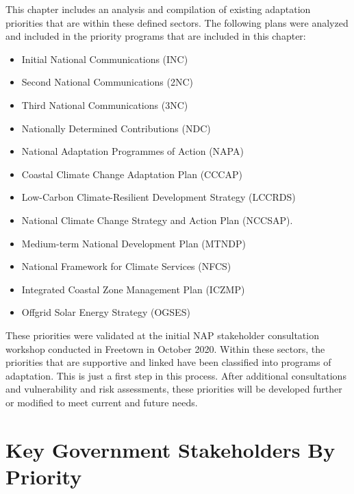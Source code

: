 \documentclass[
]{book}
\providecommand{\tightlist}{%
  \setlength{\itemsep}{0pt}\setlength{\parskip}{0pt}}
\begin{document}
This chapter includes an analysis and compilation of existing adaptation priorities that are within these defined sectors. The following plans were analyzed and included in the priority programs that are included in this chapter:

\begin{itemize}
\tightlist
\item
  Initial National Communications (INC)
\item
  Second National Communications (2NC)
\item
  Third National Communications (3NC)
\item
  Nationally Determined Contributions (NDC)
\item
  National Adaptation Programmes of Action (NAPA)
\item
  Coastal Climate Change Adaptation Plan (CCCAP)
\item
  Low-Carbon Climate-Resilient Development Strategy (LCCRDS)
\item
  National Climate Change Strategy and Action Plan (NCCSAP).
\item
  Medium-term National Development Plan (MTNDP)
\item
  National Framework for Climate Services (NFCS)
\item
  Integrated Coastal Zone Management Plan (ICZMP)
\item
  Offgrid Solar Energy Strategy (OGSES)
\end{itemize}

These priorities were validated at the initial NAP stakeholder consultation workshop conducted in Freetown in October 2020. Within these sectors, the priorities that are supportive and linked have been classified into programs of adaptation. This is just a first step in this process. After additional consultations and vulnerability and risk assessments, these priorities will be developed further or modified to meet current and future needs.

\hypertarget{key-government-stakeholders-by-priority}{%
\section{Key Government Stakeholders By Priority}\label{key-government-stakeholders-by-priority}}

\providecommand{\docline}[3]{\noalign{\global\setlength{\arrayrulewidth}{#1}}\arrayrulecolor[HTML]{#2}\cline{#3}}

\setlength{\tabcolsep}{2pt}
\end{document}
